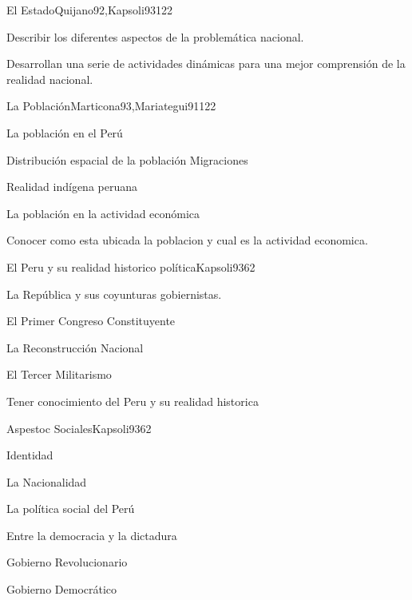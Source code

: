 \begin{syllabus}
\begin{unit}{El Estado}{Quijano92,Kapsoli93}{12}{2}
\begin{unitgoals}
      \item Describir los diferentes aspectos de la problemática nacional.
      \item Desarrollan una serie de actividades dinámicas para una mejor comprensión de la realidad nacional.
   \end{unitgoals}
\end{unit}

\begin{unit}{La Población}{Marticona93,Mariategui91}{12}{2}
\begin{topics}
	\item La población en el Perú
	\item Distribución espacial de la población Migraciones
	\item Realidad indígena peruana
	\item La población en la actividad económica
\end{topics}

\begin{unitgoals}
      \item Conocer como esta ubicada la poblacion y cual es la actividad economica.
   \end{unitgoals}
\end{unit}

\begin{unit}{El Peru y su realidad historico política}{Kapsoli93}{6}{2}
\begin{topics}
	\item La República y sus coyunturas gobiernistas.
	\item El Primer Congreso Constituyente
	\item La Reconstrucción Nacional
	\item El Tercer Militarismo
\end{topics}

\begin{unitgoals}
      \item Tener conocimiento del Peru y su realidad historica
\end{unitgoals}
\end{unit}

\begin{unit}{Aspestoc Sociales}{Kapsoli93}{6}{2}
\begin{topics}
	\item Identidad
	\item La Nacionalidad
	\item La política social del Perú
	\item Entre la democracia y la dictadura
	\item Gobierno Revolucionario
	\item Gobierno Democrático
\end{topics}


\end{unit}
\end{syllabus}
